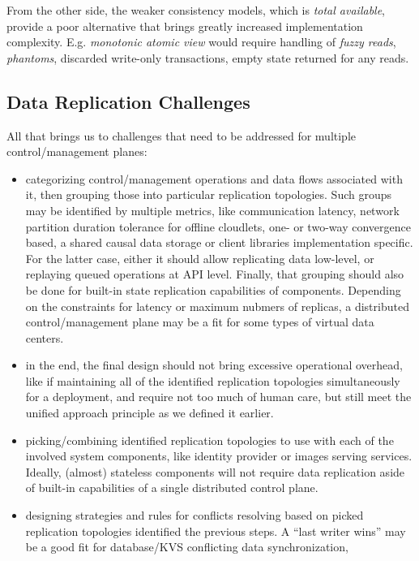 \documentclass[conference]{IEEEtran}
\begin{document}
From the other side, the weaker consistency models, which is \textit{total
available}\cite{b4}, provide a poor alternative that brings greatly increased
implementation complexity. E.g. \textit{monotonic atomic view}\cite{b4} would
require handling of \textit{fuzzy reads}\cite{b4}, \textit{phantoms}\cite{b4},
discarded write-only transactions, empty state returned for any reads.

\subsection{Data Replication Challenges}
All that brings us to challenges that need to be addressed for multiple
control/management planes:
\begin{itemize}
  \item categorizing control/management operations and data flows associated
    with it, then grouping those into particular replication topologies. Such
    groups may be identified by multiple metrics, like communication latency,
    network partition duration tolerance for offline cloudlets, one- or two-way
    convergence based, a shared causal data storage or client libraries
    implementation specific. For the latter case, either it should allow
    replicating data low-level, or replaying queued operations at API level.
    Finally, that grouping should also be done for built-in state replication
    capabilities of components. Depending on the constraints for latency or
    maximum nubmers of replicas, a distributed control/management plane may be
    a fit for some types of virtual data centers\cite{b3}.
  \item in the end, the final design should not bring excessive operational
    overhead, like if maintaining all of the identified replication topologies
    simultaneously for a deployment, and require not too much of human care,
    but still meet the unified approach principle as we defined it earlier.
  \item picking/combining identified replication topologies to use with each of
    the involved system components, like identity provider or images serving
    services. Ideally, (almost) stateless components will not require data
    replication aside of built-in capabilities of a single distributed control
    plane.
  \item designing strategies and rules for conflicts resolving based on picked
    replication topologies identified the previous steps. A ``last writer
    wins'' may be a good fit for database/KVS conflicting data synchronization,

\end{itemize}
\end{document}
